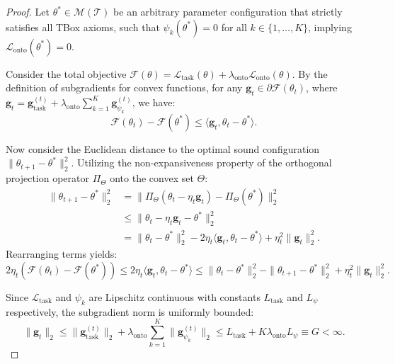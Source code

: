\documentclass[11pt,a4paper]{article}
\begin{document}
\begin{proof}
Let $\theta^* \in \mathcal{M}(\mathcal{T})$ be an arbitrary parameter configuration that strictly satisfies all TBox axioms, such that $\psi_k(\theta^*) = 0$ for all $k \in \{1, \dots, K\}$, implying $\mathcal{L}_{\mathrm{onto}}(\theta^*) = 0$. 

Consider the total objective $\mathcal{F}(\theta) = \mathcal{L}_{\mathrm{task}}(\theta) + \lambda_{\mathrm{onto}} \mathcal{L}_{\mathrm{onto}}(\theta)$. By the definition of subgradients for convex functions, for any $\mathbf{g}_t \in \partial \mathcal{F}(\theta_t)$, where $\mathbf{g}_t = \mathbf{g}_{\mathrm{task}}^{(t)} + \lambda_{\mathrm{onto}} \sum_{k=1}^K \mathbf{g}_{\psi_k}^{(t)}$, we have:
\begin{equation}
\mathcal{F}(\theta_t) - \mathcal{F}(\theta^*) \le \langle \mathbf{g}_t, \theta_t - \theta^* \rangle.
\end{equation}

Now consider the Euclidean distance to the optimal sound configuration $\|\theta_{t+1} - \theta^*\|_2^2$. Utilizing the non-expansiveness property of the orthogonal projection operator $\Pi_\Theta$ onto the convex set $\Theta$:
\begin{align}
\|\theta_{t+1} - \theta^*\|_2^2 &= \|\Pi_\Theta(\theta_t - \eta_t \mathbf{g}_t) - \Pi_\Theta(\theta^*)\|_2^2 \nonumber \\
&\le \|\theta_t - \eta_t \mathbf{g}_t - \theta^*\|_2^2 \nonumber \\
&= \|\theta_t - \theta^*\|_2^2 - 2 \eta_t \langle \mathbf{g}_t, \theta_t - \theta^* \rangle + \eta_t^2 \|\mathbf{g}_t\|_2^2.
\end{align}
Rearranging terms yields:
\begin{equation}
2 \eta_t (\mathcal{F}(\theta_t) - \mathcal{F}(\theta^*)) \le 2 \eta_t \langle \mathbf{g}_t, \theta_t - \theta^* \rangle \le \|\theta_t - \theta^*\|_2^2 - \|\theta_{t+1} - \theta^*\|_2^2 + \eta_t^2 \|\mathbf{g}_t\|_2^2.
\end{equation}

Since $\mathcal{L}_{\mathrm{task}}$ and $\psi_k$ are Lipschitz continuous with constants $L_{\mathrm{task}}$ and $L_\psi$ respectively, the subgradient norm is uniformly bounded:
\begin{equation}
\|\mathbf{g}_t\|_2 \le \|\mathbf{g}_{\mathrm{task}}^{(t)}\|_2 + \lambda_{\mathrm{onto}} \sum_{k=1}^K \|\mathbf{g}_{\psi_k}^{(t)}\|_2 \le L_{\mathrm{task}} + K \lambda_{\mathrm{onto}} L_\psi \equiv G < \infty.
\end{equation}


\end{proof}
\end{document}

